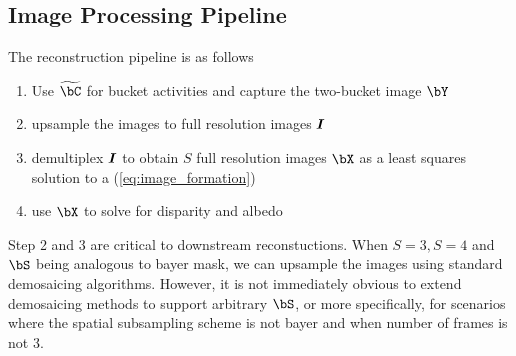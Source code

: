 \documentclass[../writeup.tex]{subfiles}
\begin{document}
\subsection{Image Processing Pipeline}
The reconstruction pipeline is as follows
\begin{enumerate}
    \item Use $\widetilde{\bC}$ for bucket activities and capture the two-bucket image $\bY$
    \item upsample the images to full resolution images $\boldsymbol{I}$
    \item demultiplex $\boldsymbol{I}$ to obtain $S$ full resolution images $\bX$ as a least squares solution to a (\ref{eq:image_formation})
    \item use $\bX$ to solve for disparity and albedo
\end{enumerate}
Step 2 and 3 are critical to downstream reconstuctions. When $S=3,S=4$ and $\bS$ being analogous to bayer mask, we can upsample the images using standard demosaicing algorithms. However, it is not immediately obvious to extend demosaicing methods to support arbitrary $\bS$, or more specifically, for scenarios where the spatial subsampling scheme is not bayer and when number of frames is not 3. 
\end{document}
